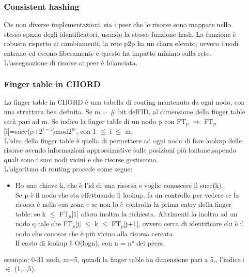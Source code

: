 \documentclass[16px]{article}
\begin{document}
\subsubsection{Consistent hashing}
Cis non diverse implementazioni, sia i peer che le risorse sono mappate nello stesso spazio degli identificatori, usando la stessa funzione hash. La funzione è robusta rispetto ai cambiamenti, la rete p2p ha un charn elevato, ovvero i nodi entrano ed escono liberamente e questo ha impatto minimo sulla rete.\\ L'assegnazione di risorse ai peer è bilanciata.
\subsubsection{Finger table in CHORD}
La finger table in CHORD è una tabella di routing mantenuta da ogni nodo, con una struttura ben definita. Se m = \# bit dell'ID, al dimensione della finger table sarà pari ad m. Se indico la finger table di un nodo p con FT$_{p}$ $\Rightarrow$ FT$_{p}$[i]=succ(p+$2^{i-1}$)mod$2^m$, con 1 $\leq$ i $\leq$ m. \\ L'idea della finger table è quella di permettere ad ogni nodo di fare lookup delle risorse avendo informazioni approssimative sulle posizioni più lontane,sapendo quali sono i suoi nodi vicini e che risorse gestiscono.\\ L'algoritmo di routing procede come segue:
\begin{itemize}
\item Ho una chiave k, che è l'id di una risorsa e voglio conoscere il succ(k).
\\ Se p è il nodo che sta effettuando il lookup, fa un controllo per vedere se la risorsa è nella sua zona e se non lo è controlla la prima entry della finger table: se k $\leq$ FT$_{p}$[1] allora inoltra la richiesta. Altrimenti la inoltra ad un nodo q tale che FT$_{p}$[j] $\leq$ k $\leq$ FT$_{p}$[j+1], ovvero cerca di identificare chi è il nodo che conosce che è più vicino alla risorsa cercata.\\ Il costo di lookup è O(logn), con n = n° dei peers.
\end{itemize}
esempio: 0-31 nodi, m=5, quindi la finger table ha dimensione pari a 5., l'indice i $\in$ (1,..,5).
\end{document}
